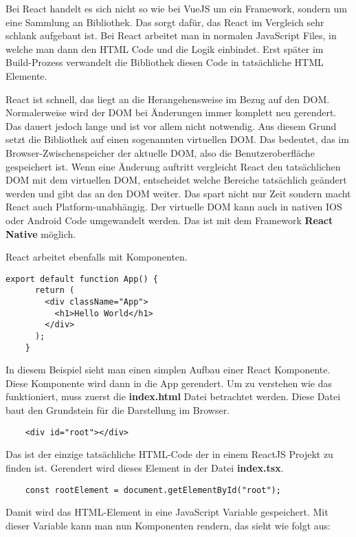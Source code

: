 Bei React handelt es sich nicht so wie bei VueJS um ein Framework, sondern um eine Sammlung an Bibliothek. Das sorgt dafür, das React im Vergleich sehr schlank aufgebaut ist. Bei React arbeitet man in normalen JavaScript Files, in welche man dann den HTML Code und die Logik einbindet. Erst später im Build-Prozess verwandelt die Bibliothek diesen Code in tatsächliche HTML Elemente. 

React ist schnell, das liegt an die Herangehensweise im Bezug auf den DOM. Normalerweise wird der DOM bei Änderungen immer komplett neu gerendert. Das dauert jedoch lange und ist vor allem nicht notwendig. Aus diesem Grund setzt die Bibliothek auf einen sogenannten virtuellen DOM. Das bedeutet, das im Browser-Zwischenspeicher der aktuelle DOM, also die Benutzeroberfläche gespeichert ist. Wenn eine Änderung auftritt vergleicht React den tatsächlichen DOM mit dem virtuellen DOM, entscheidet welche Bereiche tatsächlich geändert werden und gibt das an den DOM weiter. Das spart nicht nur Zeit sondern macht React auch Platform-unabhängig. Der virtuelle DOM kann auch in nativen IOS oder Android Code umgewandelt werden. Das ist mit dem Framework \textbf{React Native} möglich.

React arbeitet ebenfalls mit Komponenten.

\begin{lstlisting}[caption=React Komponente Grundgerüst]
    export default function App() {
      return (
        <div className="App">
          <h1>Hello World</h1>
        </div>
      );
    }
\end{lstlisting}

In diesem Beispiel sieht man einen simplen Aufbau einer React Komponente. Diese Komponente wird dann in die App gerendert. Um zu verstehen wie das funktioniert, muss zuerst die \textbf{index.html} Datei betrachtet werden. Diese Datei baut den Grundstein für die Darstellung im Browser.

\begin{lstlisting}
    <div id="root"></div>
\end{lstlisting}

Das ist der einzige tatsächliche HTML-Code der in einem ReactJS Projekt zu finden ist. Gerendert wird dieses Element in der Datei \textbf{index.tsx}.

\begin{lstlisting}
    const rootElement = document.getElementById("root");
\end{lstlisting}
\newpage
Damit wird das HTML-Element in eine JavaScript Variable gespeichert. Mit dieser Variable kann man nun Komponenten rendern, das sieht wie folgt aus:

